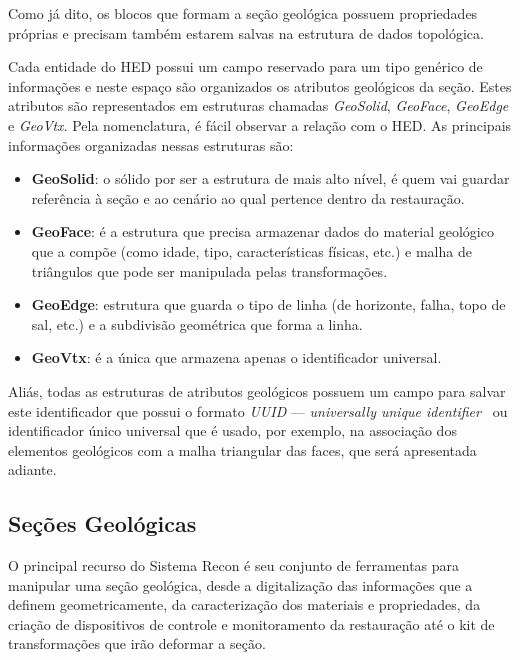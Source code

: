 Como já dito, os blocos que formam a seção geológica possuem propriedades próprias e precisam também estarem salvas na estrutura de dados topológica.

Cada entidade do HED possui um campo reservado para um tipo genérico de informações e neste espaço são organizados os atributos geológicos da seção. Estes atributos são representados em estruturas chamadas \textit{GeoSolid}, \textit{GeoFace}, \textit{GeoEdge} e \textit{GeoVtx}. Pela nomenclatura, é fácil observar a relação com o HED. As principais informações organizadas nessas estruturas são:

\renewcommand{\labelitemi}{•}
\begin{itemize}
  \item \textbf{GeoSolid}: o sólido por ser a estrutura de mais alto nível, é quem vai guardar referência à seção e ao cenário ao qual pertence dentro da restauração.
  \item \textbf{GeoFace}: é a estrutura que precisa armazenar dados do material geológico que a compõe (como idade, tipo, características físicas, etc.) e malha de triângulos que pode ser manipulada pelas transformações.
  \item \textbf{GeoEdge}: estrutura que guarda o tipo de linha (de horizonte, falha, topo de sal, etc.) e a subdivisão geométrica que forma a linha. 
  \item \textbf{GeoVtx}: é a única que armazena apenas o identificador universal.
\end{itemize}

Aliás, todas as estruturas de atributos geológicos possuem um campo para salvar este identificador que possui o formato \textit{UUID} --- \textit{universally unique identifier}~\cite{UUID} ou identificador único universal que é usado, por exemplo, na associação dos elementos geológicos com a malha triangular das faces, que será apresentada adiante.

\subsection{Seções Geológicas} %

O principal recurso do Sistema Recon é seu conjunto de ferramentas para manipular uma seção geológica, desde a digitalização das informações que a definem geometricamente, da caracterização dos materiais e propriedades, da criação de dispositivos de controle e monitoramento da restauração até o kit de transformações que irão deformar a seção.

